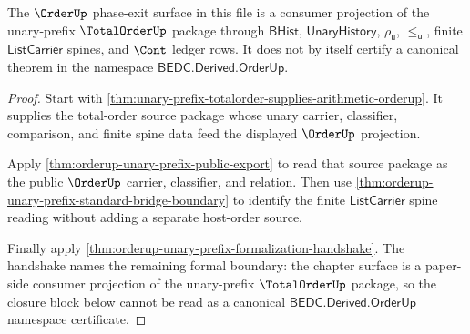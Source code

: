 \begin{theorem}
\label{thm:totalorder-orderup-phase-exit-totalorder-source-boundary}
The $\OrderUp$ phase-exit surface in this file is a consumer projection of the
unary-prefix $\TotalOrderUp$ package through $\mathsf{BHist}$,
$\mathsf{UnaryHistory}$, $\rho_{\mathsf{u}}$, $\le_{\mathsf{u}}$, finite
$\mathsf{ListCarrier}$ spines, and $\Cont$ ledger rows. It does not by itself
certify a canonical theorem in the namespace $\mathsf{BEDC.Derived.OrderUp}$.
\end{theorem}
\begin{proof}
Start with
\autoref{thm:unary-prefix-totalorder-supplies-arithmetic-orderup}. It supplies
the total-order source package whose unary carrier, classifier, comparison, and
finite spine data feed the displayed $\OrderUp$ projection.

Apply \autoref{thm:orderup-unary-prefix-public-export} to read that source
package as the public $\OrderUp$ carrier, classifier, and relation. Then use
\autoref{thm:orderup-unary-prefix-standard-bridge-boundary} to identify the
finite $\mathsf{ListCarrier}$ spine reading without adding a separate host-order
source.

Finally apply \autoref{thm:orderup-unary-prefix-formalization-handshake}. The
handshake names the remaining formal boundary: the chapter surface is a
paper-side consumer projection of the unary-prefix $\TotalOrderUp$ package, so
the closure block below cannot be read as a canonical
$\mathsf{BEDC.Derived.OrderUp}$ namespace certificate.
\end{proof}

